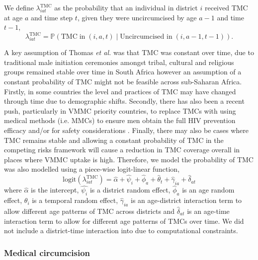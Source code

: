 \documentclass{article}
\begin{document}
\begin{appendix}

\noindent We define $\lambda^{\text{TMC}}_{iat}$ as the probability that an individual in district $i$ received TMC at age $a$ and time step $t$, given they were uncircumcised by age $a-1$ and time $t-1$, 
\begin{equation*} 
		\lambda^{\text{TMC}}_{iat} = \mathbb{P}(\text{TMC} \; \text{in} \; (i,a,t) \; | \; \text{Uncircumcised in} \; (i,a-1, t-1)). 
	\label{eqn::TMC}
\end{equation*}

A key assumption of Thomas {\it et al.} \cite{thomas2024substantial} was that TMC was constant over time, due to traditional male initiation ceremonies amongst tribal, cultural and religious groups remained stable over time in South Africa however an assumption of a constant probability of TMC might not be feasible across sub-Saharan Africa. Firstly, in some countries the level and practices of TMC may have changed through time due to demographic shifts. Secondly, there has also been a recent push, particularly in VMMC priority countries, to replace TMCs with using medical methods (i.e. MMCs) to ensure men obtain the full HIV prevention efficacy and/or for safety considerations \cite{thomas2024substantial}. Finally, there may also be cases where TMC remains stable and allowing a constant probability of TMC in the competing risks framework will cause a reduction in TMC coverage overall in places where VMMC uptake is high. Therefore, we model the probability of TMC was also modelled using a piece-wise logit-linear function, 
\begin{equation*} 
	\text{logit}(\lambda^{\text{TMC}}_{iat}) = \hat{\alpha} + \hat{\psi}_i + \hat{\phi}_a + \hat{\theta}_t + \hat{\gamma}_{ia} + \hat{\delta}_{at}
\end{equation*}
where $\hat{\alpha}$ is the intercept, $\hat{\psi_i}$ is a district random effect, $\hat{\phi}_a$ is an age random effect, $\theta_i$ is a temporal random effect,  $\hat{\gamma}_{ia}$ is an age-district interaction term to allow different age patterns of TMC across districts and $\hat{\delta}_{at}$ is an age-time interaction term to allow for different age patterns of TMCs over time. We did not include a district-time interaction into due to computational constraints. 


\subsubsection*{Medical circumcision}


\end{appendix}
\end{document}
